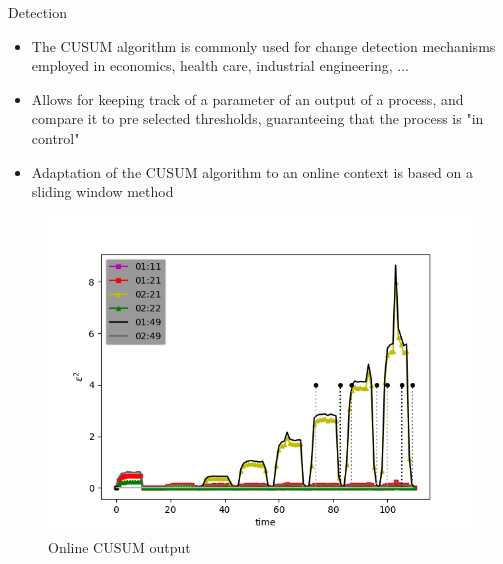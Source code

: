 \documentclass[aspectratio=43]{beamer}
\begin{document}
\begin{frame}{Detection}
    \begin{itemize}
        \item The CUSUM algorithm is commonly used for change detection mechanisms employed
            in economics, health care, industrial engineering, ...
        \item Allows for keeping track of a parameter of an output of a process, and 
            compare it to pre selected thresholds, guaranteeing that the process is "in control"
        \item<1->Adaptation of the CUSUM algorithm to an online context is based on a sliding window
            method 
    \end{itemize}

    \begin{figure}<1->
        \includegraphics[width=.6\textwidth]{meter_eleph/detection_results_plotted}
        \caption{Online CUSUM output}
    \end{figure}

\end{frame}
\end{document}
